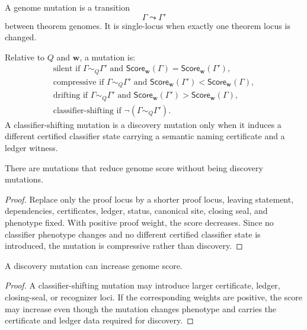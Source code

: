 \begin{definition}
\label{def:theorem-genome-mutation}
A genome mutation is a transition
$$
\Gamma\leadsto\Gamma'
$$
between theorem genomes. It is single-locus when exactly one theorem locus is
changed.
\end{definition}

\begin{definition}
\label{def:theorem-genome-mutation-classes}
Relative to $Q$ and $\mathbf w$, a mutation is:
$$
\begin{gathered}
\text{silent if }\Gamma\sim_Q\Gamma'
\text{ and }
\mathsf{Score}_{\mathbf w}(\Gamma)=\mathsf{Score}_{\mathbf w}(\Gamma'),\\
\text{compressive if }\Gamma\sim_Q\Gamma'
\text{ and }
\mathsf{Score}_{\mathbf w}(\Gamma')<\mathsf{Score}_{\mathbf w}(\Gamma),\\
\text{drifting if }\Gamma\sim_Q\Gamma'
\text{ and }
\mathsf{Score}_{\mathbf w}(\Gamma')>\mathsf{Score}_{\mathbf w}(\Gamma),\\
\text{classifier-shifting if }\neg(\Gamma\sim_Q\Gamma').
\end{gathered}
$$
A classifier-shifting mutation is a discovery mutation only when it induces a
different certified classifier state carrying a semantic naming certificate and
a ledger witness.
\end{definition}

\begin{theorem}
\label{thm:theorem-genome-compression-not-discovery}
There are mutations that reduce genome score without being discovery
mutations.
\end{theorem}
\begin{proof}
Replace only the proof locus by a shorter proof locus, leaving statement,
dependencies, certificates, ledger, status, canonical site, closing seal, and
phenotype fixed. With positive proof weight, the score decreases. Since no
classifier phenotype changes and no different certified classifier state is
introduced, the mutation is compressive rather than discovery.
\end{proof}

\begin{theorem}
\label{thm:theorem-genome-discovery-may-increase-complexity}
A discovery mutation can increase genome score.
\end{theorem}
\begin{proof}
A classifier-shifting mutation may introduce larger certificate, ledger,
closing-seal, or recognizer loci. If the corresponding weights are positive,
the score may increase even though the mutation changes phenotype and carries
the certificate and ledger data required for discovery.
\end{proof}

